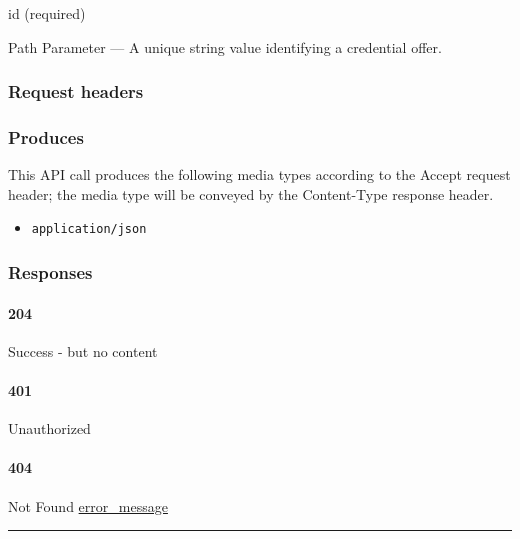id (required)

{Path Parameter} --- A unique string value identifying a credential
offer.

\hypertarget{request-headers-17}{%
\subsubsection{Request headers}\label{request-headers-17}}

\hypertarget{produces-36}{%
\subsubsection{Produces}\label{produces-36}}

This API call produces the following media types according to the
{Accept} request header; the media type will be conveyed by the
{Content-Type} response header.

\begin{itemize}
\tightlist
\item
  \texttt{application/json}
\end{itemize}

\hypertarget{responses-36}{%
\subsubsection{Responses}\label{responses-36}}

\hypertarget{section-121}{%
\paragraph{204}\label{section-121}}

Success - but no content \protect\hyperlink{}{}

\hypertarget{section-122}{%
\paragraph{401}\label{section-122}}

Unauthorized \protect\hyperlink{}{}

\hypertarget{section-123}{%
\paragraph{404}\label{section-123}}

Not Found \protect\hyperlink{error_message}{error\_message}

\begin{center}\rule{0.5\linewidth}{\linethickness}\end{center}

